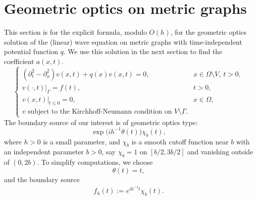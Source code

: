 \documentclass[11pt]{amsart}
\theoremstyle{definition}
\theoremstyle{plain}
\numberwithin{equation}{section}
\begin{document}
\section{Geometric optics on metric graphs}
\label{sec-CGO}

This section is for the explicit formula, modulo $O(h)$, for the geometric optics solution of the (linear) wave equation on metric graphs with time-independent potential function $q$. We use this solution in the next section to find the coefficient $a(x,t).$
\begin{equation}\label{eq-gauss}
    \begin{cases}
    (\partial_{t}^2 -\partial_x^2 ) v(x,t)+q(x) v(x,t)=0, &x\in \Omega \setminus V, \  t > 0,\\    v(\cdot,t)|_{\Gamma}=f(t), & t> 0,\\
          v(x,t)|_{t\leq 0}=0, &x\in \Omega,\\
    v \textrm{ subject to the Kirchhoff-Neumann condition on } V\setminus\Gamma.
    \end{cases}
\end{equation}
The boundary source of our interest is of geometric optics type:
\begin{equation*}
\exp \big(i h^{-1} \theta(t) \big) \chi_b(t),
\end{equation*}
where $h>0$ is a small parameter, and $\chi_b$ is a smooth cutoff function near $b$ with an independent parameter $b>0$, say $\chi_b=1$ on $[b/2,3b/2]$ and vanishing outside of $(0,2b)$.
To simplify computations, we choose 
\begin{equation} \label{theta}
\theta(t)=t,
\end{equation}
and the boundary source
\begin{eqnarray} \label{source}
f_h(t) := e^{ih^{-1}t} \chi_b(t).
\end{eqnarray}
\end{document}
